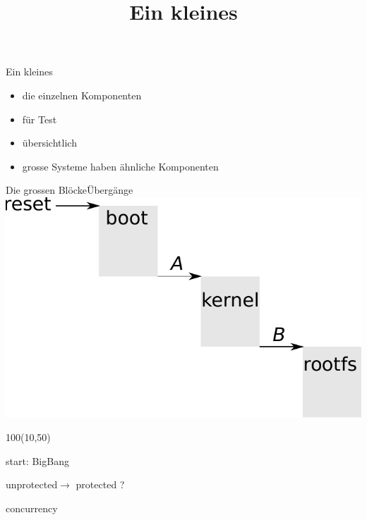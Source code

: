 \documentclass{beamer}
\begin{document}
\newcommand{\md}{\cod{md-bbb-{\em version}.img}}
\newcommand{\mdev}{\cod{md-bbb-devel-{\em version}.tar.gz}}
\title[Minimal]{Ein kleines \unix}

\frame{\titlepage}

\begin{frame}{Ein kleines \unix}
 \begin{itemize}
  \item die einzelnen Komponenten
  \item für Test
  \item übersichtlich
  \item grosse Systeme haben ähnliche Komponenten
 \end{itemize}
\end{frame}

\begin{frame}{Die grossen Blöcke}{Übergänge}
\includegraphics[width=\textwidth]{components.pdf}
\begin{textblock}{100}(10,50)
 \begin{description}[reset]
  \item[reset] start: BigBang
  \item[A] unprotected$\to$ protected ?
  \item[B] concurrency
 \end{description}
\end{textblock}
\end{frame}
\end{document}
